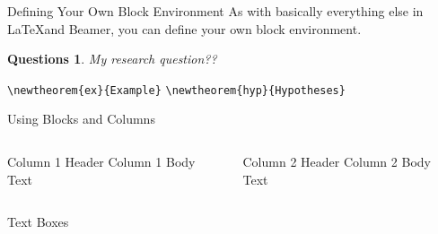 \documentclass[mathserif, xcolor=svgnames]{beamer}
\newtheorem{question}{Questions}
\begin{document}
\begin{frame}[fragile]{Defining Your Own Block Environment}
As with basically everything else in \LaTeX and Beamer, you can define your own block environment.
\vspace{10pt}
\begin{question}
My research question??
\end{question}
\vspace{10pt}
\verb+\newtheorem{ex}{Example}+
\verb+\newtheorem{hyp}{Hypotheses}+
\end{frame}

\begin{frame}{Using Blocks and Columns}
\begin{columns}[t]
\begin{block}{Column 1 Header}
Column 1 Body Text
\end{block}
\begin{block}{Column 2 Header}
Column 2 Body Text
\end{block}
\end{columns}
\end{frame}

\begin{frame}{Text Boxes}

\\
\begin{flushright}
\\
\end{flushright}
\begin{center}
\\
\end{center}
\begin{flushleft}
\\
\end{flushleft}
\begin{center}
\\
\end{center}

\end{frame}
\end{document}
